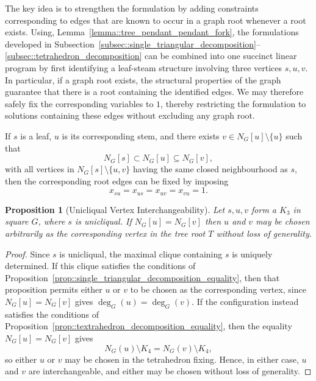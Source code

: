 \documentclass[11pt]{report}
\newtheorem{proposition}{Proposition}
\begin{document}
The key idea is to strengthen the formulation by adding constraints corresponding to edges that are known to occur in a graph root whenever a root exists. Using, Lemma~\eqref{lemma::tree_pendant_pendant_fork}, the formulations developed in Subsection~\ref{subsec::single_triangular_decomposition}--\ref{subsec::tetrahedron_decomposition} can be combined into one succinct linear program by first identifying a leaf-steam structure involving three vertices $s, u, v$. In particular, if a graph root exists, the structural properties of the graph guarantee that there is a root containing the identified edges. We may therefore safely fix the corresponding variables to $1$, thereby restricting the formulation to solutions containing these edges without excluding any graph root.

If $s$ is a leaf, $u$ is its corresponding stem, and there exists $v\in N_G[u]\setminus\{u\}$ such that
\[
N_G[s]\subset N_G[u]\subseteq N_G[v],
\]
with all vertices in $N_G[s]\setminus\{u,v\}$ having the same closed neighbourhood as $s$, then the corresponding root edges can be fixed by imposing
\begin{equation} \label{eq::unicliqual_vertex_fix}
  x_{su}=x_{us}=x_{uv}=x_{vu}=1.
\end{equation}

\begin{proposition}[Unicliqual Vertex Interchangeability] \label{prop::unicliqual_decomposition_equality}
  Let $s,u,v$ form a $K_3$ in square $G$, where $s$ is unicliqual. If $N_G[u]=N_G[v]$ then $u$ and $v$ may be chosen arbitrarily as the corresponding vertex in the tree root $T$ without loss of generality.
\end{proposition}
\begin{proof} 
  Since $s$ is unicliqual, the maximal clique containing $s$ is uniquely determined. If this clique satisfies the conditions of Proposition~\ref{prop::single_triangular_decomposition_equality}, then that proposition permits either $u$ or $v$ to be chosen as the corresponding vertex, since $N_G[u]=N_G[v]$ gives $\deg_G(u)=\deg_G(v)$. If the configuration instead satisfies the conditions of Proposition~\ref{prop::textrahedron_decomposition_equality}, then the equality $N_G[u]=N_G[v]$ gives
  \[
  N_G(u)\setminus K_4=N_G(v)\setminus K_4,
  \]
  so either $u$ or $v$ may be chosen in the tetrahedron fixing. Hence, in either case, $u$ and $v$ are interchangeable, and either may be chosen without loss of generality.
\end{proof}
\end{document}
